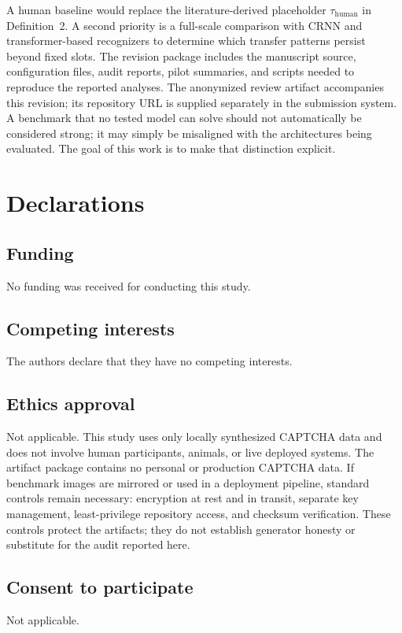 \documentclass[pdflatex,sn-mathphys-num,iicol]{sn-jnl}
\begin{document}
A human baseline would replace the literature-derived placeholder
$\tau_{\mathrm{human}}$ in Definition~2. A second priority is a full-scale
comparison with CRNN and transformer-based recognizers to determine which
transfer patterns persist beyond fixed slots.
The revision package includes the manuscript source, configuration files, audit reports, pilot summaries, and scripts needed to reproduce the reported analyses. The anonymized review artifact accompanies this revision; its repository URL is supplied separately in the submission system. A benchmark that no tested model can solve should not automatically be considered strong; it may simply be misaligned with the architectures being evaluated. The goal of this work is to make that distinction explicit.

\section*{Declarations}

\subsection*{Funding}
No funding was received for conducting this study.

\subsection*{Competing interests}
The authors declare that they have no competing interests.

\subsection*{Ethics approval}
Not applicable. This study uses only locally synthesized CAPTCHA data and does not involve human participants, animals, or live deployed systems. The artifact package contains no personal or production CAPTCHA data. If benchmark images are mirrored or used in a deployment pipeline, standard controls remain necessary: encryption at rest and in transit, separate key management, least-privilege repository access, and checksum verification. These controls protect the artifacts; they do not establish generator honesty or substitute for the audit reported here.

\subsection*{Consent to participate}
Not applicable.
\end{document}
